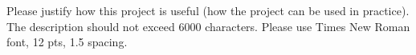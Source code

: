 Please justify how this project is useful (how the project can be used in practice).
The description should not exceed 6000 characters.
Please use Times New Roman font, 12 pts, 1.5 spacing.